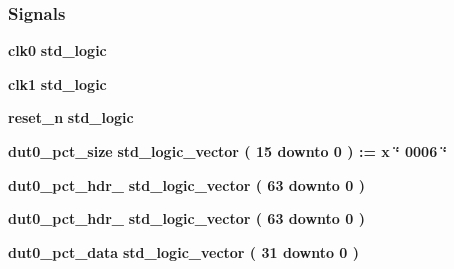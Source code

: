 \subsubsection*{Signals}
 \begin{DoxyCompactItemize}
\item 
{\bf clk0} {\bfseries \textcolor{comment}{std\+\_\+logic}\textcolor{vhdlchar}{ }} 
\item 
{\bf clk1} {\bfseries \textcolor{comment}{std\+\_\+logic}\textcolor{vhdlchar}{ }} 
\item 
{\bf reset\+\_\+n} {\bfseries \textcolor{comment}{std\+\_\+logic}\textcolor{vhdlchar}{ }} 
\item 
{\bf dut0\+\_\+pct\+\_\+size} {\bfseries \textcolor{comment}{std\+\_\+logic\+\_\+vector}\textcolor{vhdlchar}{ }\textcolor{vhdlchar}{(}\textcolor{vhdlchar}{ }\textcolor{vhdlchar}{ } \textcolor{vhdldigit}{15} \textcolor{vhdlchar}{ }\textcolor{keywordflow}{downto}\textcolor{vhdlchar}{ }\textcolor{vhdlchar}{ } \textcolor{vhdldigit}{0} \textcolor{vhdlchar}{ }\textcolor{vhdlchar}{)}\textcolor{vhdlchar}{ }\textcolor{vhdlchar}{ }\textcolor{vhdlchar}{ }\textcolor{vhdlchar}{\+:}\textcolor{vhdlchar}{=}\textcolor{vhdlchar}{ }\textcolor{vhdlchar}{ }\textcolor{vhdlchar}{x}\textcolor{vhdlchar}{ }\textcolor{keyword}{\char`\"{} 0006 \char`\"{}}\textcolor{vhdlchar}{ }} 
\item 
{\bf dut0\+\_\+pct\+\_\+hdr\+\_} {\bfseries \textcolor{comment}{std\+\_\+logic\+\_\+vector}\textcolor{vhdlchar}{ }\textcolor{vhdlchar}{(}\textcolor{vhdlchar}{ }\textcolor{vhdlchar}{ } \textcolor{vhdldigit}{63} \textcolor{vhdlchar}{ }\textcolor{keywordflow}{downto}\textcolor{vhdlchar}{ }\textcolor{vhdlchar}{ } \textcolor{vhdldigit}{0} \textcolor{vhdlchar}{ }\textcolor{vhdlchar}{)}\textcolor{vhdlchar}{ }} 
\item 
{\bf dut0\+\_\+pct\+\_\+hdr\+\_} {\bfseries \textcolor{comment}{std\+\_\+logic\+\_\+vector}\textcolor{vhdlchar}{ }\textcolor{vhdlchar}{(}\textcolor{vhdlchar}{ }\textcolor{vhdlchar}{ } \textcolor{vhdldigit}{63} \textcolor{vhdlchar}{ }\textcolor{keywordflow}{downto}\textcolor{vhdlchar}{ }\textcolor{vhdlchar}{ } \textcolor{vhdldigit}{0} \textcolor{vhdlchar}{ }\textcolor{vhdlchar}{)}\textcolor{vhdlchar}{ }} 
\item 
{\bf dut0\+\_\+pct\+\_\+data} {\bfseries \textcolor{comment}{std\+\_\+logic\+\_\+vector}\textcolor{vhdlchar}{ }\textcolor{vhdlchar}{(}\textcolor{vhdlchar}{ }\textcolor{vhdlchar}{ } \textcolor{vhdldigit}{31} \textcolor{vhdlchar}{ }\textcolor{keywordflow}{downto}\textcolor{vhdlchar}{ }\textcolor{vhdlchar}{ } \textcolor{vhdldigit}{0} \textcolor{vhdlchar}{ }\textcolor{vhdlchar}{)}\textcolor{vhdlchar}{ }} 

\end{DoxyCompactItemize}
